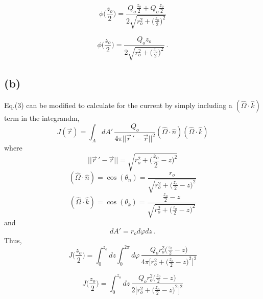 \documentclass{article}
\begin{document}
\begin{equation*}
\phi\Big(\frac{z_o}{2}\Big) = \frac{Q_o \frac{z_o}{2} + Q_o \frac{z_o}{2}}{2 \sqrt{ r_o^2 + \big(\frac{z_o}{2}\big)^2 }} 
\end{equation*}

\begin{equation*}
\boxed{ \phi\Big(\frac{z_o}{2}\Big) = \frac{Q_o z_o}{2 \sqrt{ r_o^2 + \big(\frac{z_o}{2}\big)^2 }} } \: .
\end{equation*}

\pagebreak

\subsection*{(b)}

Eq.(3) can be modified to calculate for the current by simply including a $(\hat{\Omega} \cdot \hat{k})$ term in the integrandm, 
\begin{equation*}
J(\vec{r}) = \int_A dA' \, \frac{Q_o}{4 \pi ||\vec{r}\,'-\vec{r}||^2}  (\hat{\Omega} \cdot \hat{n}) (\hat{\Omega} \cdot \hat{k})
\end{equation*}
where 
\begin{equation*}
||\vec{r}\,'-\vec{r}|| =  \sqrt{ r_o^2 + \big(\frac{z_o}{2} - z\big)^2 } 
\end{equation*}
\begin{equation*}
(\hat{\Omega} \cdot \hat{n}) = \cos(\theta_n) = \frac{r_o}{\sqrt{ r_o^2 + \big(\frac{z_o}{2} -z \big)^2 } }
\end{equation*}
\begin{equation*}
(\hat{\Omega} \cdot \hat{k}) = \cos(\theta_k) = \frac{\frac{z_o}{2} - z}{\sqrt{ r_o^2 + \big(\frac{z_o}{2} - z\big)^2 } }
\end{equation*}
and
\begin{equation*}
dA' = r_o d\varphi dz \: .
\end{equation*}
Thus,
\begin{equation*}
J\Big(\frac{z_o}{2}\Big) =\int_0^{z_o} dz \int_0^{2\pi} d\varphi \, \frac{Q_o r_o^2 \big(\frac{z_o}{2} - z\big)}{4 \pi \Big[ r_o^2 + \big(\frac{z_o}{2}-z\big)^2 \Big]^2} 
\end{equation*}

\begin{equation*}
J\Big(\frac{z_o}{2}\Big) =\int_0^{z_o} dz  \, \frac{Q_o r_o^2 \big(\frac{z_o}{2} - z\big)}{2 \Big[ r_o^2 + \big(\frac{z_o}{2}-z\big)^2 \Big]^2} 
\end{equation*}
\end{document}

